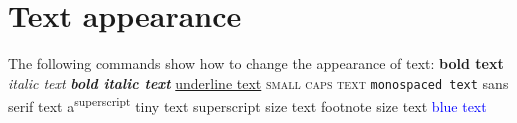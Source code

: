 \documentclass[a4paper,12pt]{article}
\begin{document}
	\section*{Text appearance}
	The following commands show how to change the appearance of text:
	\textbf{bold text}
	\emph{italic text}
	\textbf{\emph{bold italic text}}
	\underline{underline text}
	\textsc{small caps text}
	\texttt{monospaced text}
	\textsf{sans serif text}
	a\textsuperscript{superscript}
	\tiny{tiny text}
	\scriptsize{superscript size text}
	\footnotesize{footnote size text}
	\textcolor{blue}{blue text} %
		
\end{document}
